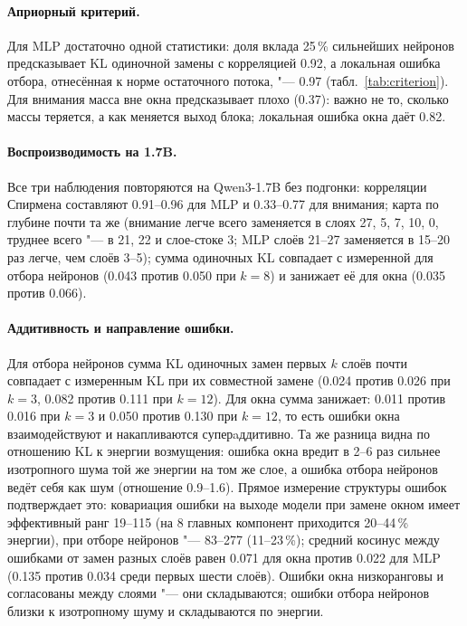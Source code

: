 \paragraph{Априорный критерий.} Для MLP достаточно одной статистики: доля
вклада 25\,\% сильнейших нейронов предсказывает KL одиночной замены с
корреляцией 0.92, а локальная ошибка отбора, отнесённая к норме
остаточного потока, "--- 0.97 (табл.~\ref{tab:criterion}). Для внимания
масса вне окна предсказывает плохо (0.37): важно не то, сколько массы
теряется, а как меняется выход блока; локальная ошибка окна даёт 0.82.

\paragraph{Воспроизводимость на 1.7B.} Все три наблюдения повторяются
на Qwen3-1.7B без подгонки: корреляции Спирмена составляют 0.91--0.96 для
MLP и 0.33--0.77 для внимания; карта по глубине почти та же (внимание
легче всего заменяется в слоях 27, 5, 7, 10, 0, труднее всего "--- в 21,
22 и слое-стоке 3; MLP слоёв 21--27 заменяется в 15--20 раз легче, чем
слоёв 3--5); сумма одиночных KL совпадает с измеренной для отбора
нейронов (0.043 против 0.050 при $k=8$) и занижает её для окна (0.035
против 0.066).

\paragraph{Аддитивность и направление ошибки.} Для отбора нейронов сумма
KL одиночных замен первых $k$ слоёв почти совпадает с измеренным KL при
их совместной замене (0.024 против 0.026 при $k=3$, 0.082 против 0.111
при $k=12$). Для окна сумма занижает: 0.011 против 0.016 при $k=3$ и
0.050 против 0.130 при $k=12$, то есть ошибки окна взаимодействуют и
накапливаются суперaддитивно. Та же разница видна по отношению KL к
энергии возмущения: ошибка окна вредит в 2--6 раз сильнее изотропного
шума той же энергии на том же слое, а ошибка отбора нейронов ведёт себя
как шум (отношение 0.9--1.6). Прямое измерение структуры ошибок
подтверждает это: ковариация ошибки на выходе модели при замене окном
имеет эффективный ранг 19--115 (на 8 главных компонент приходится
20--44\,\% энергии), при отборе нейронов "--- 83--277 (11--23\,\%); средний
косинус между ошибками от замен разных слоёв равен 0.071 для окна против
0.022 для MLP (0.135 против 0.034 среди первых шести слоёв). Ошибки окна
низкоранговы и согласованы между слоями "--- они складываются; ошибки
отбора нейронов близки к изотропному шуму и складываются по энергии.

